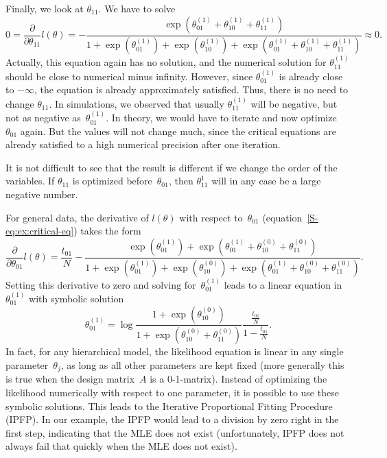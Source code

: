 \documentclass[aos,noinfoline]{imsart}
\theoremstyle{remark}
\theoremstyle{definition}
\begin{document}
  Finally, we look at $\theta_{11}$.  We have to solve
  \begin{equation*}
    0 = \frac{\partial}{\partial\theta_{11}} l(\theta) = - \frac{\exp(\theta^{(1)}_{01}+\theta^{(1)}_{10}+\theta^{(1)}_{11})}{1 + \exp(\theta^{(1)}_{01}) + \exp(\theta^{(1)}_{10}) + \exp(\theta^{(1)}_{01}+\theta^{(1)}_{10}+\theta^{(1)}_{11})} \approx 0.
  \end{equation*}
  Actually, this equation again has no solution,
  and the numerical solution for $\theta^{(1)}_{11}$ should be close to numerical minus infinity.  However, since
  $\theta^{(1)}_{01}$ is already close to $-\infty$, the equation is already approximately satisfied.  Thus, there is no
  need to change $\theta_{11}$.  In simulations, we observed that usually $\theta^{(1)}_{11}$ will be negative, but not
  as negative as~$\theta^{(1)}_{01}$.  In theory, we would have to iterate and now optimize~$\theta_{01}$ again.  But
  the values will not change much, since the critical equations are already satisfied to a high numerical precision
  after one iteration.

  It is not difficult to see that the result is different if we change the order of the variables.  If $\theta_{11}$ is
  optimized before~$\theta_{01}$, then $\theta_{11}^{1}$ will in any case be a large negative number.

  For general data, the derivative of $l(\theta)$ with respect to~$\theta_{01}$ (equation~\eqref{S-eq:ex:critical-eq}) takes the form
  \begin{equation*}
    \frac{\partial}{\partial\theta_{01}} l(\theta) = \frac{t_{01}}{N} - \frac{\exp(\theta^{(1)}_{01}) + \exp(\theta^{(1)}_{01}+\theta^{(0)}_{10}+\theta^{(0)}_{11})}{1 + \exp(\theta^{(1)}_{01}) + \exp(\theta^{(0)}_{10}) + \exp(\theta^{(1)}_{01}+\theta^{(0)}_{10}+\theta^{(0)}_{11})}.
  \end{equation*}
  Setting this derivative to zero and solving for~$\theta^{(1)}_{01}$ leads to a linear equation in~$\theta^{(1)}_{01}$
  with symbolic solution
  \begin{equation*}
    \theta^{(1)}_{01} = \log \frac{1+\exp(\theta^{(0)}_{10})}{1 + \exp(\theta^{(0)}_{10}+\theta^{(0)}_{11})}\frac{\frac{t_{01}}{N}}{1 - \frac{t_{01}}{N}}.
  \end{equation*}
  In fact, for any hierarchical model, the likelihood equation is linear in any single parameter~$\theta_{j}$, as long
  as all other parameters are kept fixed (more generally this is true when the design matrix~$A$ is a 0-1-matrix).
  Instead of optimizing the likelihood numerically with respect to one parameter, it is possible to use these symbolic
  solutions.  This leads to the Iterative Proportional Fitting Procedure (IPFP).  In our example, the IPFP would lead to
  a division by zero right in the first step, indicating that the MLE does not exist
  (unfortunately, IPFP does not always fail that quickly when the MLE does not exist).
\end{document}
